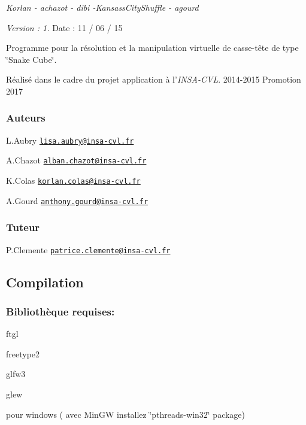 {\itshape Korlan -\/ achazot -\/ dibi -\/\-Kansass\-City\-Shuffle -\/ agourd}

{\itshape Version \-: 1.} Date \-: 11 / 06 / 15

Programme pour la résolution et la manipulation virtuelle de casse-\/tête de type \char`\"{}\-Snake Cube\char`\"{}.

Réalisé dans le cadre du projet application à l'{\itshape I\-N\-S\-A-\/\-C\-V\-L}. 2014-\/2015 Promotion 2017

\subsubsection*{Auteurs}


\begin{DoxyItemize}
\item L.\-Aubry \href{mailto:lisa.aubry@insa-cvl.fr}{\tt lisa.\-aubry@insa-\/cvl.\-fr}
\item A.\-Chazot \href{mailto:alban.chazot@insa-cvl.fr}{\tt alban.\-chazot@insa-\/cvl.\-fr}
\item K.\-Colas \href{mailto:korlan.colas@insa-cvl.fr}{\tt korlan.\-colas@insa-\/cvl.\-fr}
\item A.\-Gourd \href{mailto:anthony.gourd@insa-cvl.fr}{\tt anthony.\-gourd@insa-\/cvl.\-fr}
\end{DoxyItemize}

\subsubsection*{Tuteur}


\begin{DoxyItemize}
\item P.\-Clemente \href{mailto:patrice.clemente@insa-cvl.fr}{\tt patrice.\-clemente@insa-\/cvl.\-fr}
\end{DoxyItemize}

\subsection*{Compilation}

\subsubsection*{Bibliothèque requises\-:}


\begin{DoxyItemize}
\item ftgl
\item freetype2
\item glfw3
\item glew
\item pour windows ( avec Min\-G\-W installez \char`\"{}pthreads-\/win32\char`\"{} package)
\end{DoxyItemize}

